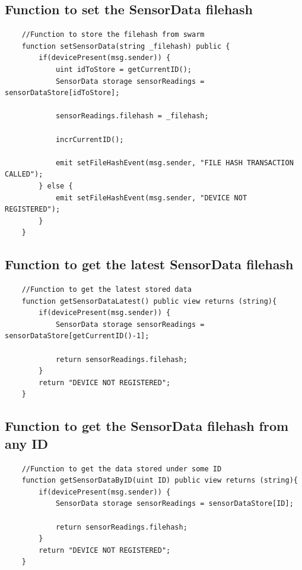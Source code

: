 \documentclass[11pt,openright]{report}
\begin{document}
\subsection{Function to set the SensorData filehash}
\begin{verbatim}
    //Function to store the filehash from swarm
    function setSensorData(string _filehash) public {
        if(devicePresent(msg.sender)) {
            uint idToStore = getCurrentID();
            SensorData storage sensorReadings = sensorDataStore[idToStore];

            sensorReadings.filehash = _filehash;
       
            incrCurrentID();
            
            emit setFileHashEvent(msg.sender, "FILE HASH TRANSACTION CALLED");
        } else {
            emit setFileHashEvent(msg.sender, "DEVICE NOT REGISTERED");
        }
    }
\end{verbatim}
\subsection{Function to get the latest SensorData filehash}
\begin{verbatim}
    //Function to get the latest stored data
    function getSensorDataLatest() public view returns (string){
        if(devicePresent(msg.sender)) {
            SensorData storage sensorReadings = sensorDataStore[getCurrentID()-1];

            return sensorReadings.filehash;
        }
        return "DEVICE NOT REGISTERED";
    }
\end{verbatim}
\subsection{Function to get the SensorData filehash from any ID}
\begin{verbatim}
    //Function to get the data stored under some ID
    function getSensorDataByID(uint ID) public view returns (string){
        if(devicePresent(msg.sender)) {
            SensorData storage sensorReadings = sensorDataStore[ID];

            return sensorReadings.filehash;
        }
        return "DEVICE NOT REGISTERED";
    }
\end{verbatim}
\end{document}
